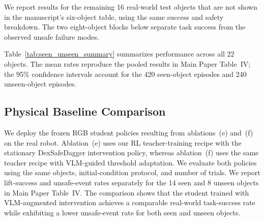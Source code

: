 We report results for the remaining 16 real-world test objects that are not
shown in the manuscript's six-object table, using the same success and safety
breakdown. The two eight-object blocks below separate task success from the
observed unsafe failure modes.



Table~\ref{tab:seen_unseen_summary} summarizes performance across all 22
objects. The mean rates reproduce the pooled results in Main Paper Table~IV;
the 95\% confidence intervals account for the 420 seen-object episodes and 240
unseen-object episodes.




\subsection{Physical Baseline Comparison}
We deploy the frozen RGB student policies resulting from ablations~(e) and~(f)
on the real robot. Ablation~(e) uses our RL teacher-training recipe with the stationary
DexSafeDagger intervention policy, whereas ablation~(f) uses the same teacher
recipe with VLM-guided threshold adaptation. We evaluate both policies
using the same objects, initial-condition protocol, and number of trials. We
report lift-success and unsafe-event rates separately for the 14 seen and 8
unseen objects in Main Paper Table~IV. The comparison shows that the student
trained with VLM-augmented intervention achieves a comparable real-world
task-success rate while exhibiting a lower unsafe-event rate for both seen and
unseen objects.
